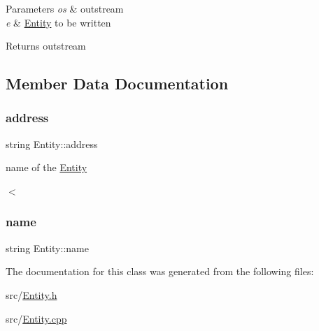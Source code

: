 \begin{DoxyParams}{Parameters}
{\em os} & outstream \\
\hline
{\em e} & \hyperlink{classEntity}{Entity} to be written \\
\hline
\end{DoxyParams}
\begin{DoxyReturn}{Returns}
outstream 
\end{DoxyReturn}


\subsection{Member Data Documentation}
\mbox{\label{classEntity_a3db10b65d221e6066fbdeebe17d5af42}} 
\subsubsection{\texorpdfstring{address}{address}}
{\footnotesize\ttfamily string Entity\+::address\hspace{0.3cm}{\ttfamily [private]}}



name of the \hyperlink{classEntity}{Entity} 

$<$ \mbox{\label{classEntity_afb45718695f537c330a463168616c262}} 
\subsubsection{\texorpdfstring{name}{name}}
{\footnotesize\ttfamily string Entity\+::name\hspace{0.3cm}{\ttfamily [private]}}



The documentation for this class was generated from the following files\+:\begin{DoxyCompactItemize}
\item 
src/\hyperlink{Entity_8h}{Entity.\+h}\item 
src/\hyperlink{Entity_8cpp}{Entity.\+cpp}\end{DoxyCompactItemize}
